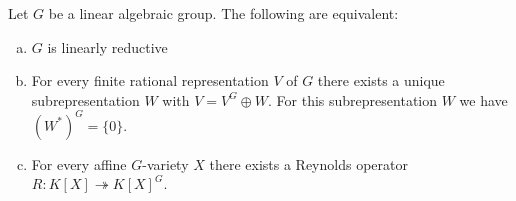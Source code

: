 \begin{theorem}\label{equiv}
  Let $G$ be a linear algebraic group.
  The following are equivalent:
  \begin{enumerate}[(a)]
  \item $G$ is linearly reductive
  \item For every finite rational representation $V$ of $G$ there exists a unique subrepresentation $W$ with $V = V^G \oplus W$.
    For this subrepresentation $W$ we have $(W^\ast)^G = \{0\}$.
  \item For every affine $G$-variety $X$ there exists a Reynolds operator $R \colon K[X] \twoheadrightarrow K[X]^G $.
  \end{enumerate}
\end{theorem}

